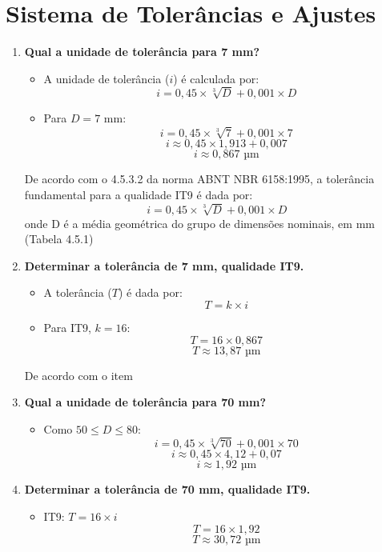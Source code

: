 \section{Sistema de Tolerâncias e Ajustes}

\begin{enumerate}
    \item \textbf{Qual a unidade de tolerância para 7 mm?}
    \begin{itemize}
        \item A unidade de tolerância (\( i \)) é calculada por:
        \[
            i = 0,45 \times \sqrt[3]{D} + 0,001 \times D
        \]
        \item Para \( D = 7 \) mm:
        \[
            i = 0,45 \times \sqrt[3]{7} + 0,001 \times 7
        \]
        \[
            i \approx 0,45 \times 1,913 + 0,007
        \]
        \[
            i \approx 0,867 \text{ µm}
        \]
    \end{itemize}
    De acordo com o 4.5.3.2 da norma ABNT NBR 6158:1995, a tolerância fundamental para a qualidade IT9 é dada por:
    \[
        i = 0,45 \times \sqrt[3]{D} + 0,001 \times D
    \]
    onde D é a média geométrica do grupo de dimensões nominais, em mm (Tabela 4.5.1)

    \item \textbf{Determinar a tolerância de 7 mm, qualidade IT9.}
    \begin{itemize}
        \item A tolerância (\( T \)) é dada por:
        \[
            T = k \times i
        \]
        \item Para IT9, \( k = 16 \):
        \[
            T = 16 \times 0,867
        \]
        \[
            T \approx 13,87 \text{ µm}
        \]
    \end{itemize}
    De acordo com o item

    \item \textbf{Qual a unidade de tolerância para 70 mm?}
    \begin{itemize}
        \item Como \( 50 \leq D \leq 80 \):
        \[
            i = 0,45 \times \sqrt[3]{70} + 0,001 \times 70
        \]
        \[
            i \approx 0,45 \times 4,12 + 0,07
        \]
        \[
            i \approx 1,92 \text{ µm}
        \]
    \end{itemize}

    \item \textbf{Determinar a tolerância de 70 mm, qualidade IT9.}
    \begin{itemize}
        \item IT9: \( T = 16 \times i \)
        \[
            T = 16 \times 1,92
        \]
        \[
            T \approx 30,72 \text{ µm}
        \]
    \end{itemize}


\end{enumerate}
